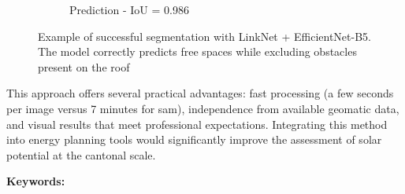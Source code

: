 \begin{figure}[htbp]
\begin{subfigure}{0.32\textwidth}
        \caption{Prediction - IoU = 0.986}
    \end{subfigure}
    \caption{Example of successful segmentation with LinkNet + EfficientNet-B5. The model correctly predicts free spaces while excluding obstacles present on the roof}
    \label{fig:abstract_exemple_segmentation_reussie}
\end{figure}

This approach offers several practical advantages: fast processing (a few seconds per image versus 7 minutes for \acrshort{sam}), independence from available geomatic data, and visual results that meet professional expectations. Integrating this method into energy planning tools would significantly improve the assessment of solar potential at the cantonal scale.

\vskip0.5cm
\textbf{Keywords:} 
\Keywords



